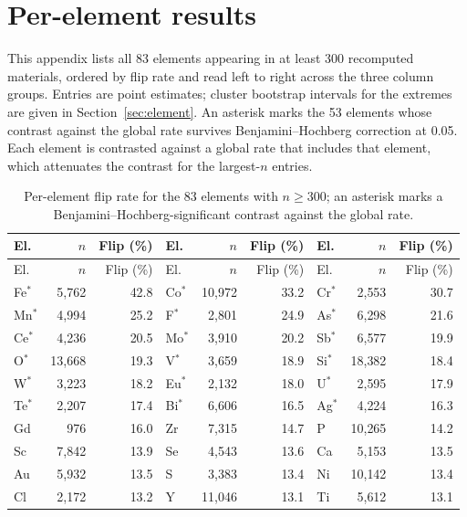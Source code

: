 \documentclass[11pt]{article}
\begin{document}
\section{Per-element results}\label{app:element}

This appendix lists all 83 elements appearing in at least 300 recomputed materials,
ordered by flip rate and read left to right across the three column groups. Entries are point estimates; cluster bootstrap
intervals for the extremes are given in Section~\ref{sec:element}. An asterisk marks the
53 elements whose contrast against the global rate survives Benjamini--Hochberg
correction at 0.05. Each element is contrasted against a global rate that includes that
element, which attenuates the contrast for the largest-$n$ entries.

\footnotesize
\begin{longtable}{lrr@{\hspace{1.6em}}lrr@{\hspace{1.6em}}lrr}
\caption{Per-element flip rate for the 83 elements with $n \ge 300$; an asterisk marks a Benjamini--Hochberg-significant contrast against the global rate.}\label{tab:appelement}\\
\toprule
El. & $n$ & Flip (\%) & El. & $n$ & Flip (\%) & El. & $n$ & Flip (\%) \\
\midrule
\endfirsthead
\toprule
El. & $n$ & Flip (\%) & El. & $n$ & Flip (\%) & El. & $n$ & Flip (\%) \\
\midrule
\endhead
Fe$^{*}$ & 5{,}762 & 42.8 & Co$^{*}$ & 10{,}972 & 33.2 & Cr$^{*}$ & 2{,}553 & 30.7 \\
Mn$^{*}$ & 4{,}994 & 25.2 & F$^{*}$ & 2{,}801 & 24.9 & As$^{*}$ & 6{,}298 & 21.6 \\
Ce$^{*}$ & 4{,}236 & 20.5 & Mo$^{*}$ & 3{,}910 & 20.2 & Sb$^{*}$ & 6{,}577 & 19.9 \\
O$^{*}$ & 13{,}668 & 19.3 & V$^{*}$ & 3{,}659 & 18.9 & Si$^{*}$ & 18{,}382 & 18.4 \\
W$^{*}$ & 3{,}223 & 18.2 & Eu$^{*}$ & 2{,}132 & 18.0 & U$^{*}$ & 2{,}595 & 17.9 \\
Te$^{*}$ & 2{,}207 & 17.4 & Bi$^{*}$ & 6{,}606 & 16.5 & Ag$^{*}$ & 4{,}224 & 16.3 \\
Gd & 976 & 16.0 & Zr & 7{,}315 & 14.7 & P & 10{,}265 & 14.2 \\
Sc & 7{,}842 & 13.9 & Se & 4{,}543 & 13.6 & Ca & 5{,}153 & 13.5 \\
Au & 5{,}932 & 13.5 & S & 3{,}383 & 13.4 & Ni & 10{,}142 & 13.4 \\
Cl & 2{,}172 & 13.2 & Y & 11{,}046 & 13.1 & Ti & 5{,}612 & 13.1 \\

\end{longtable}
\end{document}
